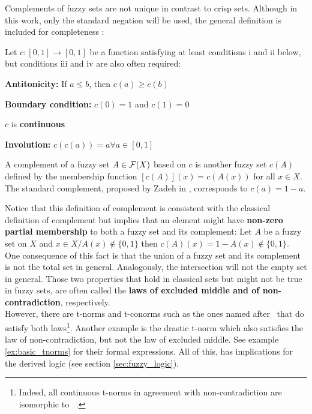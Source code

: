 Complements of fuzzy sets are not unique in contrast to crisp sets. Although in this work, only the standard negation will be used, the general definition is included for completeness \cite[p.~50]{HistoryFL2017}: 

\begin{definition}[Complement]
Let $c : [0,1] \rightarrow [0,1]$ be a function satisfying at least conditions i and ii below, but conditions iii and iv are also often required:
  \begin{romanenum}
    \item \textbf{Antitonicity:} If $a \leq b$, then $c(a) \geq c(b)$
    \item \textbf{Boundary condition:} $c(0) = 1$ and $c(1) = 0$ 
    \item $c$ is \textbf{continuous}
    \item \textbf{Involution:} $c(c(a)) = a \forall a \in [0,1]$
  \end{romanenum}
  A complement of a fuzzy set $A \in \mathcal{F}(X)$ based on $c$ is another fuzzy set $c(A)$ defined by the membership function $[c(A)](x) = c(A(x))$ for all $x \in X$.\\

  The standard complement, proposed by Zadeh in \cite{Zadeh1965}, corresponds to $c(a) = 1 - a$.
\end{definition}


Notice that this definition of complement is consistent with the classical definition of complement but implies that an element might have \textbf{non-zero partial membership} to both a fuzzy set and its complement: Let $A$ be a fuzzy set on $X$ and $x \in X / A(x)\notin \{0,1\}$ then $c( A)(x)= 1 - A(x) \notin \{0,1\}$.\\

One consequence of this fact is that the union of a fuzzy set and its complement is not the total set in general. Analogously, the intersection will not the empty set in general. Those two properties that hold in classical sets but might not be true in fuzzy sets, are often called the \textbf{laws of excluded middle and of non-contradiction}, respectively.\\

However, there are t-norms and t-conorms such as the ones named after \luka~that do satisfy both laws\footnote{Indeed, all continuous t-norms in agreement with non-contradiction are isomorphic to \luka~\cite[p.~7]{LukasiewiczNonContrad}.}. Another example is the drastic t-norm which also satisfies the law of non-contradiction, but not the law of excluded middle. See example \ref{ex:basic_tnorms} for their formal expressions. All of this, has implications for the derived logic (see section \ref{sec:fuzzy_logic}).\\

